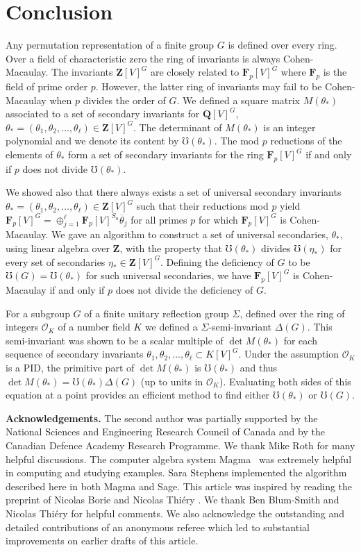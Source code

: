 \documentclass[12pt]{amsart}
\newcommand{\QQ}{\mathbf{Q}} %
\newcommand{\ZZ}{\mathbf{Z}} %
\newcommand{\FF}{\mathbf{F}} %
\newcommand{\QQ}{\mathbb{Q}} %
\newcommand{\ZZ}{\mathbb{Z}} %
\newcommand{\FF}{\mathbb{F}} %
\newcommand{\OK}{{{\mathcal O}_K}}
\theoremstyle{definition}
\newcommand{\btheta}{{\overline{\theta}}}
\newcommand{\bth}{{{\theta_*}}} %
\begin{document}
\section{Conclusion}\label{conclusion}
Any permutation representation of a finite group $G$ is defined over every ring.
Over a field of characteristic zero the ring of invariants is always 
Cohen-Macaulay.  The invariants $\ZZ[V]^G$ are closely related to 
$\FF_p[V]^G$ where $\FF_p$ is the field of prime order $p$.   
However, the latter ring of invariants may fail to be Cohen-Macaulay when 
$p$ divides the order of $G$.   
We defined a square matrix $M(\bth)$ associated to 
a set of secondary invariants for $\QQ[V]^G$,
$\bth=(\theta_1,\theta_2,\dots,\theta_\ell) \in \ZZ[V]^G$.
The determinant of $M(\bth)$ is an integer polynomial and
we denote its content by $\mho(\bth)$.
The mod $p$ reductions of the elements of $\bth$  form a set of
secondary invariants for 
the ring $\FF_p[V]^G$
if and only if $p$ does not divide $\mho(\bth)$. 
 

 

  We showed also that there always exists a set of universal secondary invariants
$\bth=(\theta_1,\theta_2,\dots,\theta_\ell)\in\ZZ[V]^G$ such that their reductions mod $p$ yield
$\FF_p[V]^G = \oplus_{j=1}^\ell \FF_p[V]^{S_n} \btheta_j$ for all primes $p$ for
which $\FF_p[V]^G$ is Cohen-Macaulay.  We gave an
algorithm to construct a set of universal secondaries, $\bth$, using linear algebra over $\ZZ$, with the property that $\mho(\bth)$ divides $\mho(\eta_*)$ for every set of secondaries $\eta_* \in \ZZ[V]^G$.  Defining the deficiency of $G$ to be $\mho(G)=\mho(\bth)$ for such
universal secondaries, we have $\FF_p[V]^G$ is Cohen-Macaulay if and  only if $p$ does not divide the deficiency of $G$.   

For a subgroup $G$ of a finite unitary reflection group $\Sigma$,
defined over the ring of integers $\OK$ of a number field $K$
we defined a $\Sigma$-semi-invariant $\Delta(G)$.  
This semi-invariant was shown to be a scalar multiple of $\det M(\bth)$ for each sequence of secondary invariants $\theta_1,\theta_2,\dots,\theta_\ell \subset K[V]^G$.
Under the assumption $\OK$ is a PID,
the primitive part of $\det M(\bth)$ is $\mho(\bth)$ and 
thus $\det M(\bth)=\mho(\bth) \Delta(G)$ (up to units in $\OK$).
Evaluating both sides of this
equation at a point provides an efficient method to find either
$\mho(\bth)$ or $\mho(G)$.





{\bf {Acknowledgements.}}
The second author was partially supported by the
National Sciences and Engineering Research Council of Canada
and by the Canadian Defence Academy Research Programme. 
We thank Mike Roth for many helpful discussions.
The computer algebra system Magma~\cite{magma} 
was extremely helpful in computing and studying examples.
Sara Stephens implemented the algorithm described here in both Magma and Sage. 
This article was inspired by reading the preprint of Nicolas Borie and 
Nicolas Thi\'ery \cite{BT}.  We thank Ben Blum-Smith and 
Nicolas Thi\'ery for helpful comments.  
We also acknowledge the outstanding and detailed contributions of an 
anonymous referee which led to substantial improvements on earlier drafts
of this article.
\end{document}
